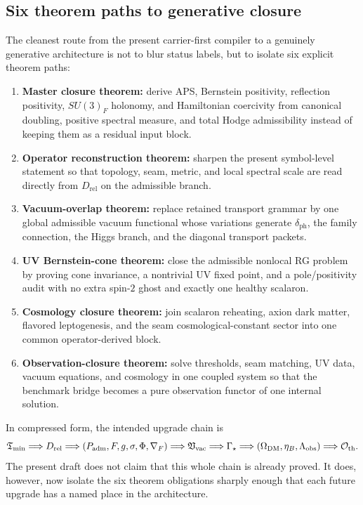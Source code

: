 \subsection{Six theorem paths to generative closure}

The cleanest route from the present carrier-first compiler to a genuinely
generative architecture is not to blur status labels, but to isolate six explicit
theorem paths:
\begin{enumerate}[label=(\arabic*), leftmargin=1.5em, topsep=3pt, itemsep=2pt]
    \item \textbf{Master closure theorem:} derive APS, Bernstein positivity, reflection positivity, $SU(3)_F$ holonomy, and Hamiltonian coercivity from canonical doubling, positive spectral measure, and total Hodge admissibility instead of keeping them as a residual input block.
    \item \textbf{Operator reconstruction theorem:} sharpen the present symbol-level statement so that topology, seam, metric, and local spectral scale are read directly from $D_{\mathrm{rel}}$ on the admissible branch.
    \item \textbf{Vacuum-overlap theorem:} replace retained transport grammar by one global admissible vacuum functional whose variations generate $\delta_{\mathrm{ph}}$, the family connection, the Higgs branch, and the diagonal transport packets.
    \item \textbf{UV Bernstein-cone theorem:} close the admissible nonlocal RG problem by proving cone invariance, a nontrivial UV fixed point, and a pole/positivity audit with no extra spin-$2$ ghost and exactly one healthy scalaron.
    \item \textbf{Cosmology closure theorem:} join scalaron reheating, axion dark matter, flavored leptogenesis, and the seam cosmological-constant sector into one common operator-derived block.
    \item \textbf{Observation-closure theorem:} solve thresholds, seam matching, UV data, vacuum equations, and cosmology in one coupled system so that the benchmark bridge becomes a pure observation functor of one internal solution.
\end{enumerate}
In compressed form, the intended upgrade chain is
\[
\mathfrak T_{\mathrm{min}}
\Longrightarrow
D_{\mathrm{rel}}
\Longrightarrow
(P_{\mathrm{adm}},F,g,\sigma,\Phi,\nabla_F)
\Longrightarrow
\mathfrak V_{\mathrm{vac}}
\Longrightarrow
\Gamma_\star
\Longrightarrow
(\Omega_{\mathrm{DM}},\eta_B,\Lambda_{\mathrm{obs}})
\Longrightarrow
\mathcal O_{\mathrm{th}}.
\]
The present draft does not claim that this whole chain is already proved. It does,
however, now isolate the six theorem obligations sharply enough that each future
upgrade has a named place in the architecture.

